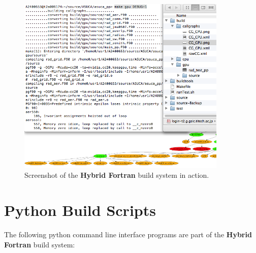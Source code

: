 \begin{figure}[htpb]
	\centering
	\includegraphics[width=10cm]{figures/uiScreenShot}
	\caption[Screenshot Build System]{Screenshot of the \textbf{Hybrid Fortran} build system in action.}
	\label{figure:buildSystemInAction}
\end{figure}

\section{Python Build Scripts} \label{sub:pythonScripts}

\noindent The following python command line interface programs are part of the \textbf{Hybrid Fortran} build system:

